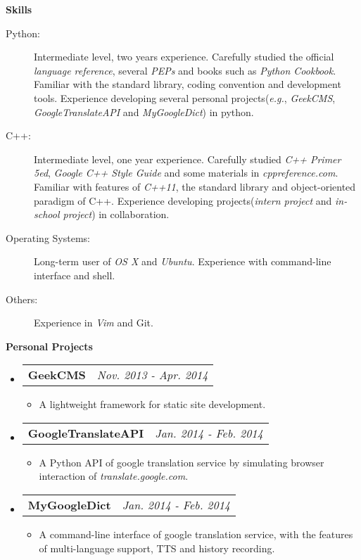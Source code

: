 \documentclass[letterpaper,11pt]{article}
\makeatletter
\newcommand{\resitem}[1]{\item #1 \vspace{-2pt}}
\newcommand{\resheading}[1]{{\large \colorbox{mygrey}{\begin{minipage}{\textwidth}{\textbf{#1 \vphantom{p\^{E}}}}\end{minipage}}}}
\newcommand{\projectsubheading}[2]{
\begin{tabular*}{7.0in}{l@{\extracolsep{\fill}}r}
		\textbf{#1} & \textit{#2} \\
\end{tabular*}\vspace{-6pt}}
\makeatother
\begin{document}
\resheading{Skills}
\begin{description}

\item[Python:] Intermediate level, two years experience.
Carefully studied the official \textit{language reference}, several \textit{PEPs} and books such as \textit{Python Cookbook}.
Familiar with the standard library, coding convention and development tools.
Experience developing several personal projects(\textit{e.g.}, \textit{GeekCMS}, \textit{GoogleTranslateAPI} and \textit{MyGoogleDict}) in python.

\item[C++:] Intermediate level, one year experience. Carefully studied \emph{C++ Primer 5ed}, \emph{Google C++ Style Guide}
and some materials in \textit{cppreference.com}.
Familiar with features of \textit{C++11}, the standard library and object-oriented paradigm of C++.
Experience developing projects(\textit{intern project} and \textit{in-school project}) in collaboration.

\item[Operating Systems:] Long-term user of \textit{OS X} and \textit{Ubuntu}. Experience with command-line interface and shell.

\item[Others:] Experience in \textit{Vim} and {Git}.

\end{description}


\resheading{Personal Projects}
\begin{itemize}
\item
  \projectsubheading{GeekCMS}{Nov. 2013 - Apr. 2014}
    \begin{itemize}
      \resitem{A lightweight framework for static site development.}
    \end{itemize}

\item
  \projectsubheading{GoogleTranslateAPI}{Jan. 2014 - Feb. 2014}
    \begin{itemize}
      \resitem{A Python API of google translation service by simulating browser interaction of \textit{translate.google.com}.}
    \end{itemize}

\item
  \projectsubheading{MyGoogleDict}{Jan. 2014 - Feb. 2014}
    \begin{itemize}
      \resitem{A command-line interface of google translation service, with the features of multi-language support, TTS and history recording.}
    \end{itemize}

\end{itemize}
\end{document}
